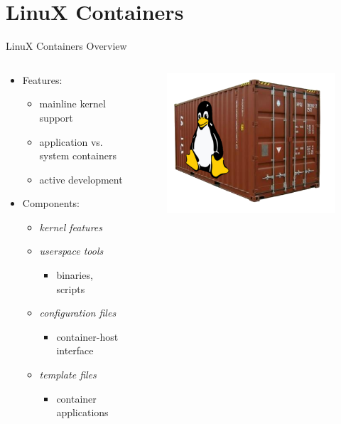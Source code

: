 \section{LinuX Containers}

\begin{frame}{LinuX Containers Overview}
	\begin{columns}[T]
		\begin{column}{.5\textwidth}
			\begin{itemize}
			\item Features:
				\begin{itemize}
				\item mainline kernel support
				\item application vs. system containers
				\item active development
				\end{itemize}
			\item Components:
				\begin{itemize}
				\item \textit{kernel features}
				\item \textit{userspace tools}
					\begin{itemize} \item binaries, scripts \end{itemize}
				\item \textit{configuration files}
					\begin{itemize} \item container-host interface \end{itemize}
				\item \textit{template files}
					\begin{itemize} \item container applications \end{itemize}
				\end{itemize}
			\end{itemize}
		\end{column}
		\begin{column}{.5\textwidth}
			\begin{figure}[ht]
				\centering
				\includegraphics[width=\textwidth]{img/containers.png}

\end{figure}
\end{column}
\end{columns}
\end{frame}

